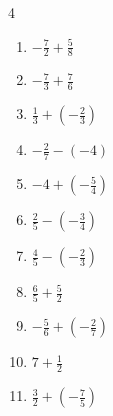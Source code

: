 \begin{multicols}{4}
\begin{enumerate}

\columnbreak %

  \item $\displaystyle -\frac{7}{2} + \frac{5}{8}$


  \item $\displaystyle -\frac{7}{3} + \frac{7}{6}$


  \item $\displaystyle \frac{1}{3} + \left(-\frac{2}{3}\right)$


  \item $\displaystyle -\frac{2}{7} - \left(-4\right)$


  \item $\displaystyle -4 + \left(-\frac{5}{4}\right)$


  \item $\displaystyle \frac{2}{5} - \left(-\frac{3}{4}\right)$


  \item $\displaystyle \frac{4}{5} - \left(-\frac{2}{3}\right)$


  \item $\displaystyle \frac{6}{5} + \frac{5}{2}$


  \item $\displaystyle -\frac{5}{6} + \left(-\frac{2}{7}\right)$


  \item $\displaystyle 7 + \frac{1}{2}$


\columnbreak %

  \item $\displaystyle \frac{3}{2} + \left(-\frac{7}{5}\right)$


\end{enumerate}
\end{multicols}

